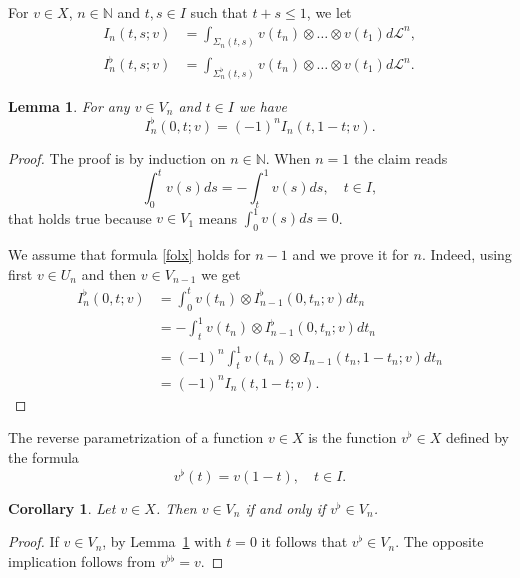 \documentclass[12pt, reqno]{amsart}
\theoremstyle{plain}
\newtheorem {lemma}[theorem]{Lemma}
\newtheorem {corollary} [theorem]{Corollary}
\theoremstyle{definition}
\theoremstyle{remark}
\numberwithin{equation}{section}
\newcommand{\N}{\mathbb{N}}
\renewcommand{\L}{\mathcal{L}}
\newcommand{\0}{\theta}
\newcommand{\1}{{-1}}
\renewcommand{\=}{\coloneqq}
\renewcommand{\.}{\dots}
\begin{document}
For $v\in X $, $n\in\N$ and $t,s \in  I $ such that $t+s\leq 1$, we  let
\[
\begin{split}
 I_n(t,s;v)& = 
 \int_{\Sigma_n(t,s) }v(t_n)\otimes \dots\otimes v(t_1) d\L^n,
 \\
 I_n^\flat (t,s;v)& = 
 \int_{\Sigma_n^\flat (t,s) }v(t_n)\otimes \dots\otimes v(t_1) d\L^n.
\end{split}
\]



\begin{lemma}\label{bemolle} For any $v\in  V_n$ and $ t\in  I $ we have 
\begin{equation}\label{folx}
 I_n^\flat (0,t;v) = (-1)^n  
 I_n (t,1-t;v).
\end{equation}

\end{lemma}


\begin{proof}
The proof is by induction on $n\in\N$. When $n=1$ the claim reads
\[
  \int_0^t v(s) ds = - \int_t^1 v(s)d s, \quad t\in  I ,
\]
that holds true because $v\in V_1$ means $\displaystyle \int_0^1 v(s) ds=0$.

We assume that  formula \eqref{folx} holds for $n-1$ and we prove it for $n$. Indeed, using first  $v\in U_n$   and then $v \in V_{n-1}$ we get
\[
\begin{split}
 I_n^\flat (0,t;v) &   = \int_{0}^ t v(t_n) \otimes  I_{n-1} ^\flat (0,t_n;v) 
 d t_n 
 \\
 &   =-  \int_{t}^ 1 v(t_n) \otimes  I_{n-1}^\flat  (0,t_n;v) 
 d t_n 
 \\
 &=(-1)^{n}  \int_{t}^ 1 v(t_n) \otimes  I _{n-1} (t_n,1 -t_n;v) 
 d t_n
 \\
 &=(-1)^{n}  I_n (t,1-t;v).
  \end{split}
\]
\end{proof}

The reverse parametrization of a function $v \in X $ 
is the function $v^\flat \in X $ defined by the formula
\[
v^\flat(t)= v(1-t),\quad     t\in I.
\]


\begin{corollary}\label{lemma:finitevs}
	Let 
	$v \in X $. Then  $v\in V_n$ if and only if  $v^\flat \in V_n$.
\end{corollary}

\begin{proof}
If $v\in V_n$, by Lemma~\ref{bemolle} with $t=0$ it follows that $v^\flat \in V_n$.
The opposite implication follows from $v^{\flat\flat}=v$.
\end{proof}
\end{document}
